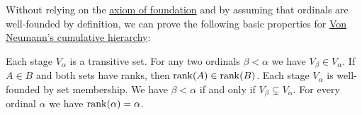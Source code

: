 \begin{proposition}\label{thm:cumulative_hierarchy_properties}
  Without relying on the \hyperref[def:zfc/foundation]{axiom of foundation} and by assuming that ordinals are well-founded by definition, we can prove the following basic properties for \hyperref[def:cumulative_hierarchy]{Von Neumann's cumulative hierarchy}:
  \begin{thmenum}
     Each stage \( V_\alpha \) is a transitive set.
     For any two ordinals \( \beta < \alpha \) we have \( V_\beta \in V_\alpha \).
     If \( A \in B \) and both sets have ranks, then \( \operatorname{rank}(A) \in \operatorname{rank}(B) \).
     Each stage \( V_\alpha \) is well-founded by set membership.
     We have \( \beta < \alpha \) if and only if \( V_\beta \subsetneq V_\alpha \).
     For every ordinal \( \alpha \) we have \( \operatorname{rank}(\alpha) = \alpha \).
  \end{thmenum}
\end{proposition}
